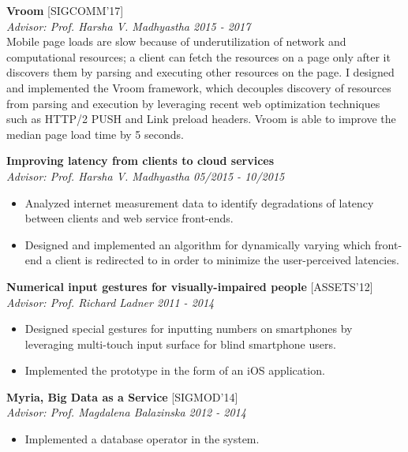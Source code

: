 \documentclass[zhemargin]{res}
\begin{document}
\begin{resume}
  \textbf{Vroom} [SIGCOMM'17]\\
    \textit{Advisor: Prof. Harsha V. Madhyastha \hfill 2015 - 2017}\\
    Mobile page loads are slow because of underutilization of network and
    computational resources; a client can fetch the resources on a page only
    after it discovers them by parsing and executing other resources on the
    page.  I designed and implemented the Vroom framework, which decouples
    discovery of resources from parsing and execution by leveraging recent web
    optimization techniques such as HTTP/2 PUSH and Link preload headers. Vroom
    is able to improve the median page load time by 5 seconds.

	\textbf{Improving latency from clients to cloud services}\\
    \textit{Advisor: Prof. Harsha V. Madhyastha \hfill 05/2015 - 10/2015}
	\begin{itemize}
    \item Analyzed internet measurement data to identify degradations of
      latency between clients and web service front-ends.
    \item Designed and implemented an algorithm for dynamically varying
      which front-end a client is redirected to in order to minimize the
      user-perceived latencies.
	\end{itemize}

	\textbf{Numerical input gestures for visually-impaired people} [ASSETS'12]\\
    \textit{Advisor: Prof. Richard Ladner \hfill 2011 - 2014}
	\begin{itemize}
    \item Designed special gestures for inputting numbers on smartphones
      by leveraging multi-touch input surface for blind smartphone users.
    \item Implemented the prototype in the form of an iOS application.
	\end{itemize}

	\textbf{Myria, Big Data as a Service} [SIGMOD'14]\\
    \textit{Advisor: Prof. Magdalena Balazinska \hfill 2012 - 2014}
	\begin{itemize}
    \item Implemented a database operator in the system.
	\end{itemize}



\end{resume}
\end{document}
